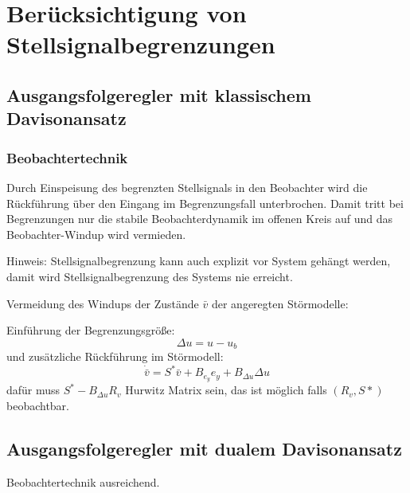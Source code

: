 \section{Berücksichtigung von Stellsignalbegrenzungen}
\subsection{Ausgangsfolgeregler mit klassischem Davisonansatz}
\subsubsection{Beobachtertechnik}
Durch Einspeisung des begrenzten Stellsignals in den Beobachter wird die Rückführung
über den Eingang im Begrenzungsfall unterbrochen. Damit tritt bei Begrenzungen nur die
stabile Beobachterdynamik im offenen Kreis auf und das Beobachter-Windup wird vermieden.

\vspace{.5cm}

Hinweis: Stellsignalbegrenzung kann auch explizit vor System gehängt werden, damit
wird Stellsignalbegrenzung des Systems nie erreicht.

\vspace{.5cm}

Vermeidung des Windups der Zustände $\bar{v}$ der angeregten Störmodelle:

Einführung der Begrenzungsgröße:
\begin{equation}
    \Delta u  = u - u_b
\end{equation}
und zusätzliche Rückführung im Störmodell:
\begin{equation}
    \dot{\bar{v}} = S^* \bar{v} + B_{e_y} e_y + B_{\Delta u} \Delta u
\end{equation}
dafür muss $S^*-B_{\Delta u}R_v$ Hurwitz Matrix sein, das ist möglich falls $(R_v, S*)$
beobachtbar.

\subsection{Ausgangsfolgeregler mit dualem Davisonansatz}
Beobachtertechnik ausreichend.
